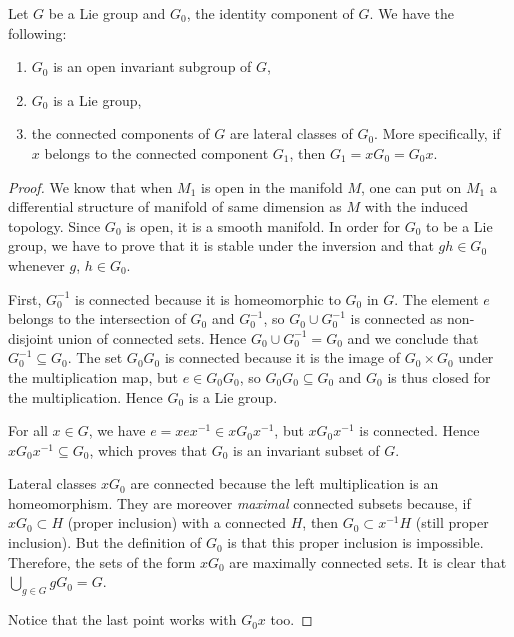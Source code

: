 \begin{proposition}
Let $G$ be a Lie group and $G_0$, the identity component of $G$. We have the following:
\begin{enumerate}
\item $G_0$ is an open invariant subgroup of $G$,
\item $G_0$ is a Lie group,
\item the connected components of $G$ are lateral classes of $G_0$. More specifically, if $x$ belongs to the connected component $G_1$, then $G_1=xG_0=G_0x$.
\end{enumerate}

\end{proposition}

\begin{proof}
We know that when $M_{1}$ is open in the manifold $M$, one can put on $M_{1}$ a differential structure of manifold of same dimension as $M$ with the induced topology. Since $G_0$ is open, it is a smooth manifold. In order for $G_0$ to be a Lie group, we have to prove that it is stable under the inversion and that $gh\in G_0$ whenever $g$, $h\in G_0$.

First, $G_0^{-1}$ is connected because  it is homeomorphic to $G_0$ in $G$. The element $e$ belongs to the intersection of $G_0$ and $G_0^{-1}$, so $G_0\cup G_0^{-1}$ is connected as non-disjoint union of connected sets. Hence $G_0\cup G_0^{-1}=G_0$ and we conclude that $G_0^{-1}\subseteq G_0$. The set $G_0G_0$ is connected because it is the image of $G_0\times G_0$ under the multiplication map, but $e\in G_0G_0$, so $G_0G_0\subseteq G_0$ and  $G_0$ is thus closed for the multiplication. Hence $G_0$ is a Lie group.

For all $x\in G$, we have $e=xex^{-1}\in xG_0x^{-1}$, but $xG_0x^{-1}$ is connected. Hence $xG_0x^{-1}\subseteq G_0$, which proves that $G_0$ is an invariant subset of $G$.

Lateral classes $xG_0$ are connected because the left multiplication is an homeomorphism. They are moreover \emph{maximal} connected subsets because, if $xG_0\subset H$ (proper inclusion) with a connected $H$, then $G_0\subset x^{-1}H$ (still proper inclusion). But the definition of $G_0$ is that this proper inclusion is impossible. Therefore, the sets of the form $xG_0$ are maximally connected sets. It is clear that $\bigcup_{g\in G}gG_0=G$.

Notice that the last point works with $G_0x$ too.
\end{proof}

